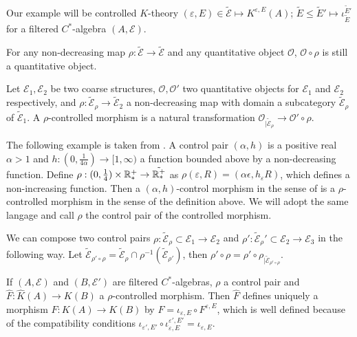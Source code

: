 \begin{Expl}Our example will be controlled $K$-theory $(\varepsilon,E)\in\mathcal{\tilde E}\mapsto K^{\varepsilon,E}(A)$; $\tilde E \leq\tilde E'\mapsto \iota_{\tilde E}^{\tilde E'}$ for a filtered $C^*$-algebra $(A,\mathcal E)$.\end{Expl}

\begin{rk}For any non-decreasing map $\rho : \mathcal{\tilde E}\rightarrow \mathcal{\tilde E}$ and any quantitative object $\mathcal O$, $\mathcal O\circ \rho $ is still a quantitative object. \end{rk}

\begin{definition}Let $\mathcal E_1,\mathcal E_2$ be two coarse structures, $\mathcal O,\mathcal O'$ two quantitative objects for $\mathcal E_1$ and $\mathcal E_2$ respectively, and $\rho : \mathcal{\tilde E}_\rho\rightarrow \mathcal{\tilde E}_2$ a non-decreasing map with domain a subcategory $\mathcal{\tilde E}_\rho$ of $\mathcal{\tilde E}_1$. A $\rho$-controlled morphism is a natural transformation $\mathcal O_{|\mathcal{\tilde E}_\rho} \rightarrow \mathcal O'\circ \rho$.\end{definition}

\begin{Expl}
The following example is taken from \cite{OY2}. A control pair $(\alpha,h)$ is a positive real $\alpha>1$ and $h:(0,\frac{1}{4\alpha})\rightarrow [1,\infty)$ a function bounded above by a non-decreasing function. Define $\rho : (0,\frac{1}{4})\times\mathbb R_*^+\rightarrow \tilde{\mathbb R_*^+}$ as $\rho(\varepsilon, R)=(\alpha \epsilon,h_\varepsilon R)$, which defines a non-increasing function. Then a $(\alpha,h)$-control morphism in the sense of \cite{OY2} is a $\rho$-controlled morphism in the sense of the definition above. We will adopt the same langage and call $\rho$ the control pair of the controlled morphism.
\end{Expl}
 
We can compose two control pairs $\rho : \mathcal {\tilde E}_\rho\subset \mathcal E_1\rightarrow \mathcal E_2$ and $\rho' : \mathcal {\tilde E}_\rho'\subset \mathcal E_2\rightarrow \mathcal E_3$ in the following way. Let $\mathcal {\tilde E}_{\rho'\circ\rho}=\mathcal {\tilde E}_\rho\cap \rho^{-1}(\mathcal {\tilde E}_{\rho'})$, then $\rho'\circ\rho =\rho'\circ\rho_{|\mathcal {\tilde E}_{\rho'\circ\rho}}$.\\

\begin{rk}
If $(A,\mathcal E)$ and $(B,\mathcal E')$ are filtered $C^*$-algebras, $\rho$ a control pair and $\hat F : \hat K(A)\rightarrow K(B)$ a $\rho$-controlled morphism. Then $\hat F$ defines uniquely a morphism $F : K(A)\rightarrow K(B)$ by $F=\iota_{\varepsilon, E}\circ F^{\varepsilon,E}$, which is well defined because of the compatibility conditions $\iota_{\varepsilon',E'}\circ\iota_{\varepsilon,E}^{\varepsilon',E'}=\iota_{\varepsilon, E}$. 
\end{rk}

